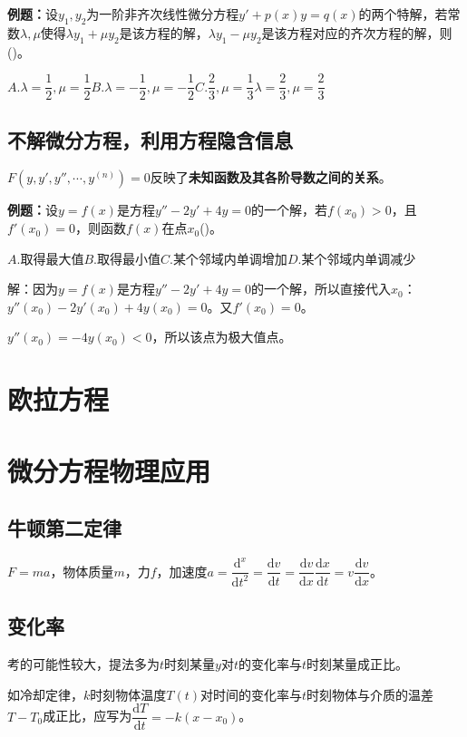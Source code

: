 \documentclass[UTF8, 12pt]{ctexart}
\begin{document}
\textbf{例题：}设$y_1,y_2$为一阶非齐次线性微分方程$y'+p(x)y=q(x)$的两个特解，若常数$\lambda,\mu$使得$\lambda y_1+\mu y_2$是该方程的解，$\lambda y_1-\mu y_2$是该方程对应的齐次方程的解，则()。

$A.\lambda=\dfrac{1}{2},\mu=\dfrac{1}{2}$\qquad$B.\lambda=-\dfrac{1}{2},\mu=-\dfrac{1}{2}$\qquad$C.\dfrac{2}{3},\mu=\dfrac{1}{3}$\qquad$\lambda=\dfrac{2}{3},\mu=\dfrac{2}{3}$

\subsection{不解微分方程，利用方程隐含信息}

$F(y,y',y'',\cdots,y^{(n)})=0$反映了\textbf{未知函数及其各阶导数之间的关系}。

\textbf{例题：}设$y=f(x)$是方程$y''-2y'+4y=0$的一个解，若$f(x_0)>0$，且$f'(x_0)=0$，则函数$f(x)$在点$x_0$()。

$A.$取得最大值\qquad$B.$取得最小值\qquad$C.$某个邻域内单调增加\qquad$D.$某个邻域内单调减少

解：因为$y=f(x)$是方程$y''-2y'+4y=0$的一个解，所以直接代入$x_0$：$y''(x_0)-2y'(x_0)+4y(x_0)=0$。又$f'(x_0)=0$。

$y''(x_0)=-4y(x_0)<0$，所以该点为极大值点。

\section{欧拉方程}

\section{微分方程物理应用}

\subsection{牛顿第二定律}

$F=ma$，物体质量$m$，力$f$，加速度$a=\dfrac{\textrm{d}^x}{\textrm{d}t^2}=\dfrac{\textrm{d}v}{\textrm{d}t}=\dfrac{\textrm{d}v}{\textrm{d}x}\dfrac{\textrm{d}x}{\textrm{d}t}=v\dfrac{\textrm{d}v}{\textrm{d}x}$。

\subsection{变化率}

考的可能性较大，提法多为$t$时刻某量$y$对$t$的变化率与$t$时刻某量成正比。

如冷却定律，$k$时刻物体温度$T(t)$对时间的变化率与$t$时刻物体与介质的温差$T-T_0$成正比，应写为$\dfrac{\textrm{d}T}{\textrm{d}t}=-k(x-x_0)$。
\end{document}
